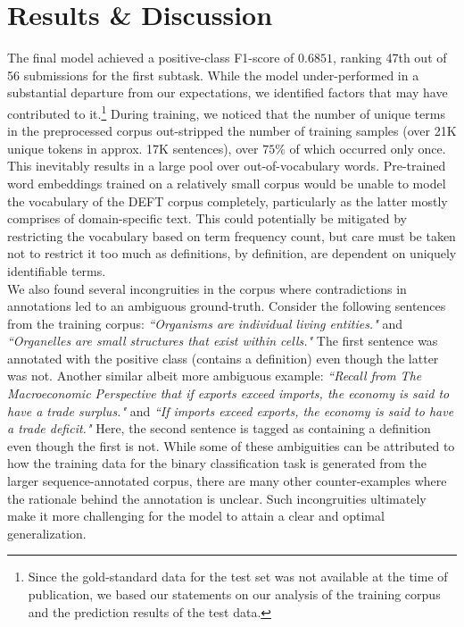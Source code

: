 \documentclass[11pt]{article}
\begin{document}
\section{Results \& Discussion}
The final model achieved a positive-class F1-score of $0.6851$, ranking 47th out of 56 submissions for the first subtask. While the
model under-performed in a substantial departure from our expectations, we identified factors that may have contributed to
it.\footnote{Since the gold-standard data for the test set was not available at the time of publication, we based our statements on
our analysis of the training corpus and the prediction results of the test data.} During training, we noticed that the number of
unique terms in the preprocessed corpus out-stripped the number of training samples (over 21K unique tokens in approx. 17K
sentences), over $75\%$ of which occurred only once. This inevitably results in a large pool over out-of-vocabulary words.
Pre-trained word embeddings trained on a relatively small corpus would be unable to model the vocabulary of the DEFT corpus completely,
particularly as the latter mostly comprises of domain-specific text. This could potentially be mitigated by restricting the
vocabulary based on term frequency count, but care must be taken not to restrict it too much as definitions, by definition, are
dependent on uniquely identifiable terms.\\

We also found several incongruities in the corpus where contradictions in annotations led to an ambiguous ground-truth. Consider the
following sentences from the training corpus: \emph{``Organisms are individual living entities."} and \emph{``Organelles are small
structures that exist within cells."} The first sentence was annotated with the positive class (contains a definition) even though the
latter was not. Another similar albeit more ambiguous example: \emph{``Recall from The Macroeconomic Perspective that if exports exceed imports, the economy is said to have a trade surplus."} and \emph{``If imports exceed exports, the economy is said to have a trade deficit."} Here, the second sentence is tagged as containing a definition even though the first is not. While some of these
ambiguities can be attributed to how the training data for the binary classification task is generated from the larger sequence-annotated
corpus, there are many other counter-examples where the rationale behind the annotation is unclear. Such incongruities ultimately
make it more challenging for the model to attain a clear and optimal generalization.\\
\end{document}
